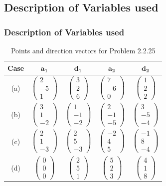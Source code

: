 \documentclass{beamer}
\theoremstyle{remark}
\newcommand{\myvec}[1]{\ensuremath{\begin{pmatrix}#1\end{pmatrix}}}
\let\vec\mathbf
\numberwithin{equation}{section}
\begin{document}
\subsection{Description of Variables used}
\begin{frame}
\frametitle{Description of Variables used}
\begin{table}[H]
\centering
\begin{tabular}{|c|c|c|c|c|}
\hline
Case & $\vec{a_1}$ & $\vec{d_1}$ & $\vec{a_2}$ & $\vec{d_2}$ \\
\hline
(a) & $\myvec{2 \\ -5 \\ 1}$ & $\myvec{3 \\ 2 \\ 6}$ & $\myvec{7 \\ -6 \\ 0}$ & $\myvec{1 \\ 2 \\ 2}$ \\
\hline
(b) & $\myvec{3 \\ 1 \\ -2}$ & $\myvec{1 \\ -1 \\ -2}$ & $\myvec{2 \\ -1 \\ -5}$ & $\myvec{3 \\ -5 \\ -4}$ \\
\hline
(c) & $\myvec{2 \\ 1 \\ -3}$ & $\myvec{2 \\ 5 \\ -3}$ & $\myvec{-2 \\ 4 \\ 5}$ & $\myvec{-1 \\ 8 \\ -4}$ \\
\hline
(d) & $\myvec{0 \\ 0 \\ 0}$ & $\myvec{2 \\ 5 \\ 1}$ & $\myvec{5 \\ 2 \\ 3}$ & $\myvec{4 \\ 1 \\ 8}$ \\
\hline
\end{tabular}
\caption{Points and direction vectors for Problem 2.2.25}
\label{}
\end{table}



\end{frame}
\end{document}
